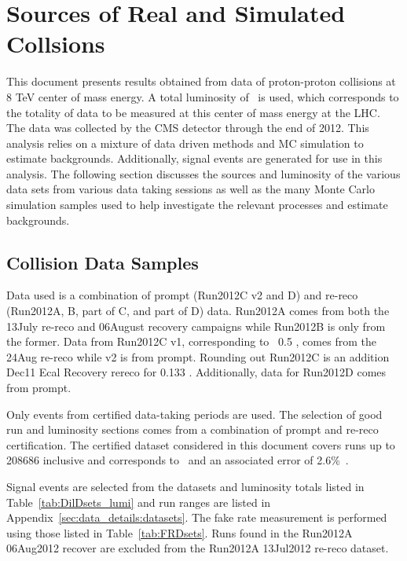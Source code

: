 \chapter{Sources of Real and Simulated Collsions}
\label{ch:samples}
This document presents results obtained from data of proton-proton collisions at 8 TeV center of mass energy. A total luminosity of \intLumi \ is used, which corresponds to the totality of data to be measured at this center of mass energy at the LHC. The data was collected by the CMS detector through the end of 2012. This analysis relies on a mixture of data driven methods and MC simulation to estimate backgrounds. Additionally, signal events are generated for use in this analysis. The following section discusses the sources and luminosity of the various data sets from various data taking sessions as well as the many Monte Carlo simulation samples used to help investigate the relevant processes and estimate backgrounds.\\


\section{Collision Data Samples}
		
	
	Data used is a combination of prompt (Run2012C v2 and D) and re-reco (Run2012A, B, part of C, and part of D) data.  
Run2012A comes from both the 13July re-reco and 06August recovery campaigns while Run2012B is only from the former.  
Data from Run2012C v1, corresponding to ~0.5 \fbinv, comes from the 24Aug re-reco while v2 is from prompt. Rounding out Run2012C is an addition Dec11 Ecal Recovery rereco for 0.133 \fbinv. Additionally, data for Run2012D comes from prompt.
    
Only events from certified data-taking periods are used.  
The selection of good run and luminosity sections comes from a combination of prompt and re-reco certification.  
The certified dataset considered in this document covers runs up to 208686 inclusive and corresponds to \intLumi \ and an associated error of 2.6\%~\cite{lumi12up}. 


	
	
	
Signal events are selected from the datasets and luminosity totals listed in Table~\ref{tab:DilDsets_lumi} and run ranges are listed in Appendix~\ref{sec:data_details:datasets}.  The fake rate measurement is performed using those listed in Table~\ref{tab:FRDsets}.  Runs found in the Run2012A 06Aug2012 recover are excluded from the Run2012A 13Jul2012 re-reco dataset. 

